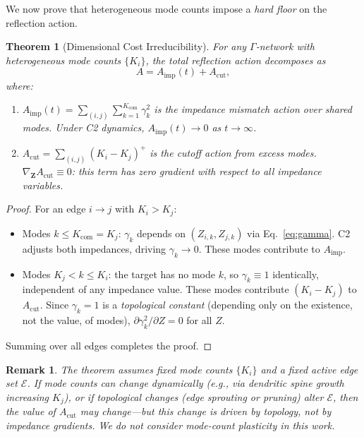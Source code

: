 \documentclass[aps,pre,twocolumn,superscriptaddress,floatfix]{revtex4-2}
\newtheorem{theorem}{Theorem}
\newtheorem{remark}{Remark}
\newcommand{\Aimp}{A_{\text{imp}}}
\newcommand{\Acut}{A_{\text{cut}}}
\newcommand{\Kcom}{K_{\text{com}}}
\begin{document}
We now prove that heterogeneous mode counts impose a
\emph{hard floor} on the reflection action.

\begin{theorem}[Dimensional Cost Irreducibility]
\label{thm:irreducibility}
For any $\Gamma$-network with heterogeneous mode counts $\{K_i\}$,
the total reflection action decomposes as
\begin{equation}
A = \Aimp(t) + \Acut,
\label{eq:decomposition}
\end{equation}
where:
\begin{enumerate}
\item
$\Aimp(t) = \sum_{(i,j)} \sum_{k=1}^{\Kcom} \gamma_k^2$
is the \emph{impedance mismatch action} over shared modes.
Under C2 dynamics, $\Aimp(t) \to 0$ as $t \to \infty$.

\item
$\Acut = \sum_{(i,j)} (K_i - K_j)^+$
is the \emph{cutoff action} from excess modes.
$\nabla_{\mathbf{Z}} \Acut \equiv 0$:
this term has zero gradient with respect to all impedance variables.
\end{enumerate}
\end{theorem}

\begin{proof}
For an edge $i \to j$ with $K_i > K_j$:
\begin{itemize}
\item
Modes $k \le \Kcom = K_j$:
$\gamma_k$ depends on $(Z_{i,k}, Z_{j,k})$ via Eq.~\eqref{eq:gamma}.
C2 adjusts both impedances, driving $\gamma_k \to 0$.
These modes contribute to $\Aimp$.

\item
Modes $K_j < k \le K_i$:
the target has no mode $k$, so $\gamma_k \equiv 1$ identically,
independent of any impedance value.
These modes contribute $(K_i - K_j)$ to $\Acut$.
Since $\gamma_k = 1$ is a \emph{topological constant}
(depending only on the existence, not the value, of modes),
$\partial \gamma_k^2 / \partial Z = 0$ for all $Z$.
\end{itemize}
Summing over all edges completes the proof.
\end{proof}

\begin{remark}
The theorem assumes fixed mode counts $\{K_i\}$ and a fixed
active edge set $\mathcal{E}$.
If mode counts can change dynamically (e.g., via dendritic
spine growth increasing $K_j$), or if topological changes
(edge sprouting or pruning) alter $\mathcal{E}$, then the
\emph{value} of $\Acut$ may change---but this change is
driven by topology, not by impedance gradients.
We do not consider mode-count plasticity in this work.
\end{remark}
\end{document}
